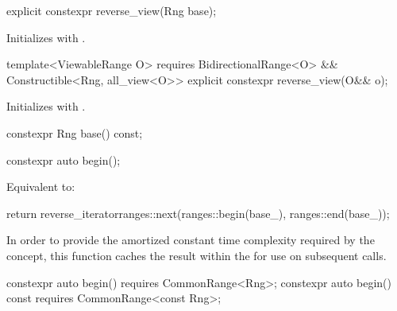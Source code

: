 {%
\begin{itemdecl}
explicit constexpr reverse_view(Rng base);
\end{itemdecl}

\begin{itemdescr}
\pnum
\effects Initializes  with .
\end{itemdescr}

%
\begin{itemdecl}
template<ViewableRange O>
  requires BidirectionalRange<O> && Constructible<Rng, all_view<O>>
explicit constexpr reverse_view(O&& o);
\end{itemdecl}

\begin{itemdescr}
\pnum
\effects Initializes  with .
\end{itemdescr}

%
\begin{itemdecl}
constexpr Rng base() const;
\end{itemdecl}

\begin{itemdescr}
\pnum
\oldtxt{\returns}  
\end{itemdescr}

%
\begin{itemdecl}
constexpr auto begin();
\end{itemdecl}

\begin{itemdescr}
\pnum
\effects Equivalent to:
\begin{codeblock}
return reverse_iterator{ranges::next(ranges::begin(base_), ranges::end(base_))};
\end{codeblock}

\pnum
\remarks In order to provide the amortized constant time complexity required by
the  concept, this function caches the result within the
 for use on subsequent calls.
\end{itemdescr}

%
\begin{itemdecl}
constexpr auto begin() requires CommonRange<Rng>;
constexpr auto begin() const requires CommonRange<const Rng>;
\end{itemdecl}

}
